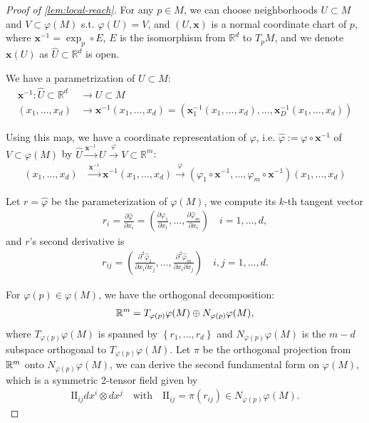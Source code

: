 \begin{proof}[Proof of \cref{lem:local-reach}]
For any $p \in M$, we can choose neighborhoods $U\subset M$ and $V \subset \varphi(M)$ s.t. $\varphi(U)=V$, and $(U,\mathbf{x})$ is a normal coordinate chart of $p$, where $\mathbf{x}^{-1}=\exp_p \circ E$, $E$ is the isomorphism from $\mathbb{R}^d$ to $T_pM$, and we denote $\mathbf{x}(U)$ as $\hat{U} \subset \mathbb{R}^d$ is open. 

We have a parametrization of $U\subset M$: 
\begin{align}
	\mathbf{x}^{-1}: \hat{U}\subset \mathbb{R}^d &\rightarrow U \subset M \\
	(x_1,\dots,x_d) &\rightarrow \mathbf{x}^{-1}(x_1,\dots,x_d)= (\mathbf{x}^{-1}_1(x_1,\dots,x_d),\dots,\mathbf{x}^{-1}_D(x_1,\dots,x_d))
\end{align}


Using this map, we have a coordinate representation of $\varphi$, i.e.  $\hat{\varphi}:=\varphi \circ \mathbf{x}^{-1}$ of $V \subset \varphi(M)$ by $\hat{U}\overset{\mathbf{x}^{-1}}{\rightarrow}U \overset{\varphi}{\rightarrow} V \subset \mathbb{R}^m$:
\begin{align}
(x_1,\dots,x_d) &\overset{\mathbf{x}^{-1}}{\rightarrow} \mathbf{x}^{-1}(x_1,\dots,x_d) \overset{\varphi}{\rightarrow} (\varphi_1\circ \mathbf{x}^{-1},\dots,\varphi_m\circ \mathbf{x}^{-1})(x_1,\dots,x_d)
\end{align}

Let $r=\hat{\varphi}$ be the parameterization of $\varphi(M)$, we compute its $k$-th tangent vector
\begin{align}
	r_i=\frac{\partial \hat{\varphi}}{\partial x_i}=\left(\frac{\partial \hat{\varphi}_1}{\partial x_i},\dots,\frac{\partial \hat{\varphi}_m}{\partial x_i}\right)\quad  i=1,\dots,d,
\end{align}
and $r$'s second derivative is 
\begin{align}
	r_{ij}=\left(\frac{\partial^2 \hat{\varphi}_1}{\partial x_i \partial x_j},\dots,\frac{\partial^2 \hat{\varphi}_m}{\partial x_i \partial x_j}\right)\quad  i,j=1,\dots,d .
\end{align}

For $\varphi(p) \in \varphi(M)$, we have the orthogonal decomposition:
\begin{align}
	\mathbb{R}^m=T_{\varphi(p)}\varphi(M) \oplus N_{\varphi(p)}\varphi(M),
\end{align}
where $T_{\varphi(p)}\varphi(M)$ is spanned by $\left\{r_1,\dots,r_d\right\}$ and $ N_{\varphi(p)}\varphi(M)$ is the $m-d$ subspace orthogonal to $T_{\varphi(p)}\varphi(M)$. Let $\pi$ be the orthogonal projection from $\mathbb{R}^m$ onto $N_{\varphi(p)}\varphi(M)$, we can derive the second fundamental form on $\varphi(M)$, which is a symmetric 2-tensor field given by 
\begin{align}
	\mathrm{II}_{ij} dx^i \otimes dx^j \quad 
	\text{with} \quad \mathrm{II}_{ij} = \pi(r_{ij}) \in  N_{\varphi(p)}\varphi(M).
\end{align}


\end{proof}
